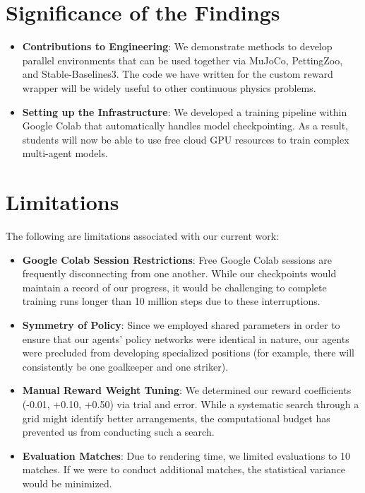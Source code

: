 \section{Significance of the Findings}
\label{sec:significance}

\begin{itemize}
    \item \textbf{Contributions to Engineering}: We demonstrate methods to develop parallel environments that can be used together via MuJoCo, PettingZoo, and Stable-Baselines3. The code we have written for the custom reward wrapper will be widely useful to other continuous physics problems.
    \item \textbf{Setting up the Infrastructure}: We developed a training pipeline within Google Colab that automatically handles model checkpointing. As a result, students will now be able to use free cloud GPU resources to train complex multi-agent models.
\end{itemize}

\section{Limitations}
\label{sec:limitations}

The following are limitations associated with our current work:

\begin{itemize}
    \item \textbf{Google Colab Session Restrictions}: Free Google Colab sessions are frequently disconnecting from one another. While our checkpoints would maintain a record of our progress, it would be challenging to complete training runs longer than 10 million steps due to these interruptions.
    \item \textbf{Symmetry of Policy}: Since we employed shared parameters in order to ensure that our agents' policy networks were identical in nature, our agents were precluded from developing specialized positions (for example, there will consistently be one goalkeeper and one striker).
    \item \textbf{Manual Reward Weight Tuning}: We determined our reward coefficients (-0.01, +0.10, +0.50) via trial and error. While a systematic search through a grid might identify better arrangements, the computational budget has prevented us from conducting such a search.
    \item \textbf{Evaluation Matches}: Due to rendering time, we limited evaluations to 10 matches. If we were to conduct additional matches, the statistical variance would be minimized.
\end{itemize}

